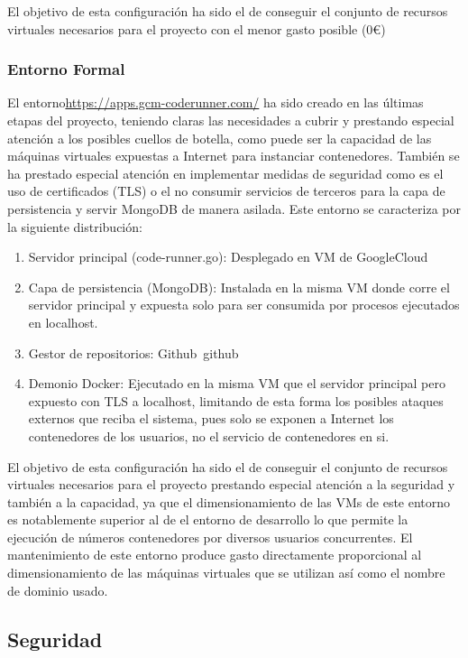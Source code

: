 \documentclass[a4paper,11pt]{book}
\begin{document}
El objetivo de esta configuración ha sido el de conseguir el conjunto de recursos virtuales necesarios para el proyecto con el menor gasto posible (0€)

\subsubsection{Entorno Formal}

El entorno\url{https://apps.gcm-coderunner.com/} ha sido creado en las últimas etapas del proyecto, teniendo claras las necesidades a cubrir y prestando especial atención a los posibles cuellos de botella, como puede ser la capacidad de las máquinas virtuales expuestas a Internet para instanciar contenedores.  También se ha prestado especial atención en implementar medidas de seguridad como es el uso de certificados (TLS) o el no consumir servicios de terceros para la capa de persistencia y servir MongoDB de manera asilada. Este entorno se caracteriza por la siguiente distribución: 

\begin{enumerate}
\item Servidor principal (code-runner.go): Desplegado en VM de GoogleCloud~\cite{gcp}
\item Capa de persistencia (MongoDB): Instalada en la misma VM donde corre el servidor principal y expuesta solo para ser consumida por procesos ejecutados en localhost. 
\item Gestor de repositorios: Github~github
\item Demonio Docker: Ejecutado en la misma VM que el servidor principal  pero expuesto con TLS a localhost, limitando de esta forma los posibles ataques externos que reciba el sistema, pues solo se exponen a Internet los contenedores de los usuarios, no el servicio de contenedores en si. 
\end{enumerate}


El objetivo de esta configuración ha sido el de conseguir el conjunto de recursos virtuales necesarios para el proyecto prestando especial atención a la seguridad y también a la capacidad, ya que el dimensionamiento de las VMs de este entorno es notablemente superior al de el entorno de desarrollo lo que permite la ejecución de números contenedores por diversos usuarios concurrentes.  El mantenimiento de este entorno produce gasto directamente proporcional al dimensionamiento de las máquinas virtuales que se utilizan así como el nombre de dominio usado. 

\subsection{Seguridad}
\end{document}
